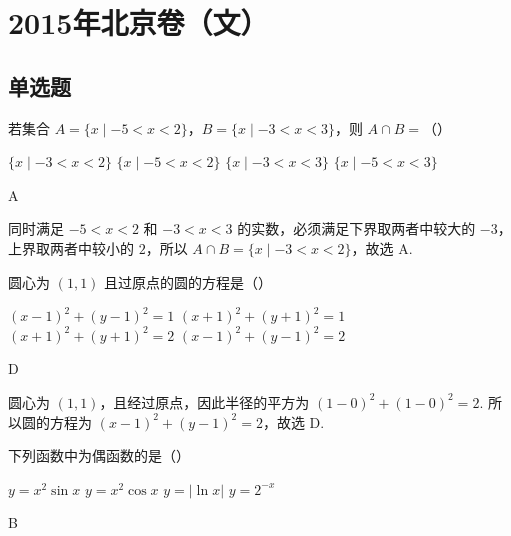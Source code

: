 \chapter{2015年北京卷（文）}

\section{单选题}

\begin{problem}
若集合 \(A = \{x \mid -5 < x < 2\}\)，\(B = \{x \mid -3 < x < 3\}\)，则 \(A \cap B =\)（\quad）

\choices
    {\(\{x\mid -3 < x < 2\}\)}
    {\(\{x\mid -5 < x < 2\}\)}
    {\(\{x\mid -3 < x < 3\}\)}
    {\(\{x\mid -5 < x < 3\}\)}
\end{problem}

\begin{answer}
A
\end{answer}

\begin{solution}
同时满足 \(-5<x<2\) 和 \(-3<x<3\) 的实数，必须满足下界取两者中较大的 \(-3\)，上界取两者中较小的 \(2\)，所以 \(A\cap B=\{x\mid -3<x<2\}\)，故选 A.
\end{solution}

\begin{problem}
圆心为 \((1,1)\) 且过原点的圆的方程是（\quad）

\choices
    {\((x - 1)^2 + (y - 1)^2 = 1\)}
    {\((x + 1)^{2} + (y + 1)^{2} = 1\)}
    {\((x + 1)^{2} + (y + 1)^{2} = 2\)}
    {\((x - 1)^{2} + (y - 1)^{2} = 2\)}
\end{problem}

\begin{answer}
D
\end{answer}

\begin{solution}
圆心为 \((1,1)\)，且经过原点，因此半径的平方为 \((1-0)^2+(1-0)^2=2\). 所以圆的方程为 \((x-1)^2+(y-1)^2=2\)，故选 D.
\end{solution}

\begin{problem}
下列函数中为偶函数的是（\quad）

\choices
    {\(y = x^{2}\sin x\)}
    {\( y = x^{2}\cos x \)}
    {\(y = |\ln x|\)}
    {\( y = 2^{-x} \)}
\end{problem}

\begin{answer}
B
\end{answer}

